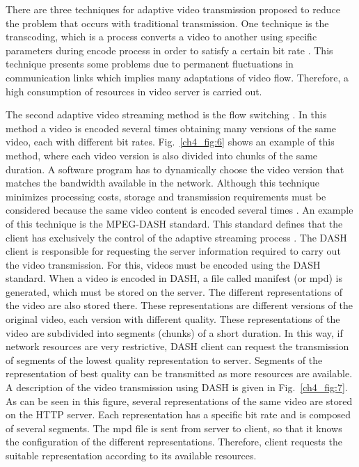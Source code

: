 There are three techniques for adaptive video transmission proposed to reduce the problem that occurs with traditional transmission. One technique is the transcoding, which is a process converts a video to another using specific parameters during encode process in order to satisfy a certain bit rate \cite{gonzalez_2016}. This technique presents some problems due to permanent fluctuations in communication links which implies many adaptations of video flow. Therefore, a high consumption of resources in video server is carried out.

The second adaptive video streaming method is the flow switching \cite{bing_2015}. In this method a video is encoded several times obtaining many versions of the same video, each with different bit rates. Fig.~\ref{ch4_fig:6} shows an example of this method, where each video version is also divided into chunks of the same duration. A software program has to dynamically choose the video version that matches the bandwidth available in the network. Although this technique minimizes processing costs, storage and transmission requirements must be considered because the same video content is encoded several times \cite{gonzalez_2016}. An example of this technique is the MPEG-DASH standard. This standard defines that the client has exclusively the control of the adaptive streaming process \cite{bing_2015}. The DASH client is responsible for requesting the server information required to carry out the video transmission. For this, videos must be encoded using the DASH standard. When a video is encoded in DASH, a file called manifest (or mpd) is generated, which must be stored on the server. The different representations of the video are also stored there. These representations are different versions of the original video, each version with different quality. These representations of the video are subdivided into segments (chunks) of a short duration. In this way, if network resources are very restrictive, DASH client can request the transmission of segments of the lowest quality representation to server.  Segments of the representation of best quality can be transmitted as more resources are available. A description of the video transmission using DASH is given in Fig.~\ref{ch4_fig:7}. As can be seen in this figure, several representations of the same video are stored on the HTTP server. Each representation has a specific bit rate and is composed of several segments. The mpd file is sent from server to client, so that it knows the configuration of the different representations. Therefore, client requests the suitable representation according to its available resources.

